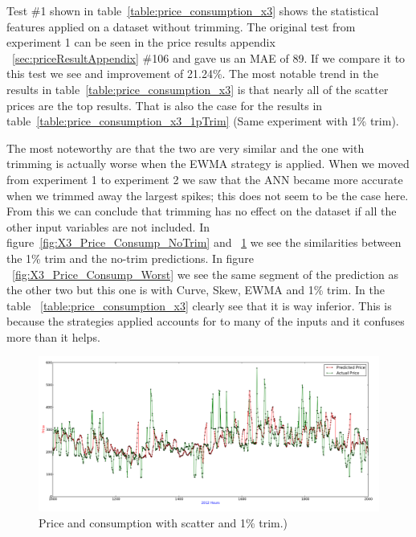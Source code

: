 Test \#1 shown in table~\ref{table:price_consumption_x3} shows the statistical features applied on a dataset without trimming. The original test from experiment 1 can be seen in the price results appendix ~\ref{sec:priceResultAppendix} \#106 and gave us an MAE of 89. If we compare it to this test we see and improvement of 21.24\%. The most notable trend in the results in table~\ref{table:price_consumption_x3} is that nearly all of the scatter prices are the top results. That is also the case for the results in table~\ref{table:price_consumption_x3_1pTrim} (Same experiment with 1\% trim).

The most noteworthy are that the two are very similar and the one with trimming is actually worse when the EWMA strategy is applied. When we moved from experiment 1 to experiment 2 we saw that the ANN became more accurate when we trimmed away the largest spikes; this does not seem to be the case here. From this we can conclude that trimming has no effect on the dataset if all the other input variables are not included. In figure~\ref{fig:X3_Price_Consump_NoTrim} and ~\ref{fig:X3_Price_Consump_1pTrim} we see the similarities between the 1\% trim and the no-trim predictions. In figure ~\ref{fig:X3_Price_Consump_Worst} we see the same segment of the prediction as the other two but this one is with Curve, Skew, EWMA and 1\% trim. In the table ~\ref{table:price_consumption_x3} clearly see that it is way inferior. This is because the strategies applied accounts for to many of the inputs and it confuses more than it helps.

\begin{figure}[H]
\centering
\includegraphics[width=\linewidth,natwidth=898,natheight=587]{billeder/PriceExperimentalAnalysis/X3_Price_Consump_1pTrim.png}
\caption{Price and consumption with scatter and 1\% trim.)}
\label{fig:X3_Price_Consump_1pTrim}
\end{figure}

